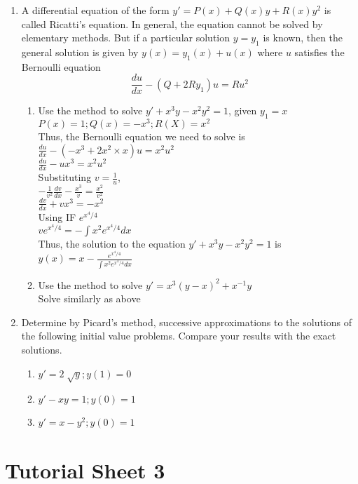 \documentclass[a4paper]{article}
\begin{document}
\begin{enumerate}
\item{A differential equation of the form $y'=P(x)+Q(x)y+R(x)y^2$ is called Ricatti's equation. In general, the equation cannot be solved by elementary methods. But if a particular solution $y=y_1$ is known, then the general solution is given by $y(x)=y_1(x)+u(x)$ where $u$ satisfies the Bernoulli equation
\[\frac{du}{dx}-(Q+2Ry_1)u=Ru^2\]
\begin{enumerate}
\item{Use the method to solve $y'+x^3y-x^2y^2=1$, given $y_1=x$
\\$P(x)=1; Q(x)=-x^3; R(X)=x^2$
\\Thus, the Bernoulli equation we need to solve is
\\$\frac{du}{dx}-(-x^3+2x^2\times x)u=x^2u^2$
\\$\frac{du}{dx}-ux^3=x^2u^2$
\\Substituting $v=\frac{1}{u}$,
\\$-\frac{1}{v^2}\frac{dv}{dx}-\frac{x^3}{v}=\frac{x^2}{v^2}$
\\$\frac{dv}{dx}+vx^3=-x^2$
\\Using IF $e^{x^4/4}$
\\$ve^{x^4/4}=-\int x^2e^{x^4/4} dx$
\\Thus, the solution to the equation $y'+x^3y-x^2y^2=1$ is
\\$y(x)=x-\frac{e^{x^4/4}}{\int x^2e^{x^4/4} dx}$
}
\item{Use the method to solve $y'=x^3(y-x)^2+x^{-1}y$
\\Solve similarly as above
}
\end{enumerate}
}
\item{Determine by Picard's method, successive approximations to the solutions of the following initial value problems. Compare your results with the exact solutions.
\begin{enumerate}
\item{$y'=2\sqrt[]{y}; y(1)=0$}
\item{$y'-xy=1; y(0)=1$}
\item{$y'=x-y^2; y(0)=1$}
\end{enumerate}
}
\end{enumerate}
\section{Tutorial Sheet 3}
\end{document}
